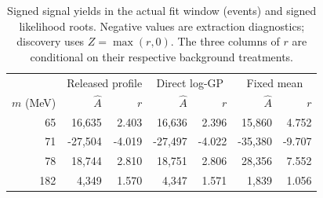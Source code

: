 \begin{table}[H]\centering\small
\setlength{\tabcolsep}{5pt}
\begin{tabular}{rrrrrrr}\toprule
 & \multicolumn{2}{c}{Released profile} & \multicolumn{2}{c}{Direct log-GP} & \multicolumn{2}{c}{Fixed mean}\\
$m$ (MeV) & $\hat A$ & $r$ & $\hat A$ & $r$ & $\hat A$ & $r$\\\midrule
65 & 16,635 & 2.403 & 16,636 & 2.396 & 15,860 & 4.752\\
71 & -27,504 & -4.019 & -27,497 & -4.022 & -35,380 & -9.707\\
78 & 18,744 & 2.810 & 18,751 & 2.806 & 28,356 & 7.552\\
182 & 4,349 & 1.570 & 4,347 & 1.571 & 1,839 & 1.056\\
\bottomrule\end{tabular}
\caption{Signed signal yields in the actual fit window (events) and signed likelihood roots. Negative values are extraction diagnostics; discovery uses $Z=\max(r,0)$. The three columns of $r$ are conditional on their respective background treatments.}
\label{tab:fits}\end{table}
